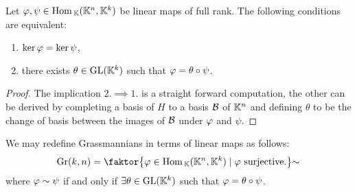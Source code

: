 \begin{lemma}\label{kerAkerBVSActionOfGLk}
Let $\varphi,\psi\in \mathrm{Hom}\,_{\mathbb{K}}(\mathbb{K}^n,\mathbb{K}^k)$ be linear maps of full rank. The following conditions are equivalent:
\begin{enumerate}
    \item $\ker\varphi=\ker\psi$,
    \item there exists $\theta\in \mathrm{GL}(\mathbb{K}^k)$ such that $\varphi=\theta\circ \psi$. 
\end{enumerate}
\end{lemma}
\begin{proof}
The implication $2.\implies 1.$ is a straight forward computation, the other can be derived by completing a basis of $H$ to a basis $\mathcal{B}$ of $\mathbb{K}^n$ and defining $\theta$ to be the change of basis between the images of $\mathcal{B}$ under $\varphi$ and $\psi$.
\end{proof}

\begin{corollary}\label{LinearQuotientDefinition}
We may redefine Grassmannians in terms of linear maps as follows:
\[\Gr(k,n)=\quot{\cpa{\vp\in \Hom_\K(\K^n,\K^k)\mid \vp\ \text{surjective.}}}\sim\]
where $\varphi\sim \psi$ if and only if $\exists \theta\in \mathrm{GL}(\mathbb{K}^k)$ such that $\varphi=\theta\circ \psi$.
\end{corollary}
\bigskip

